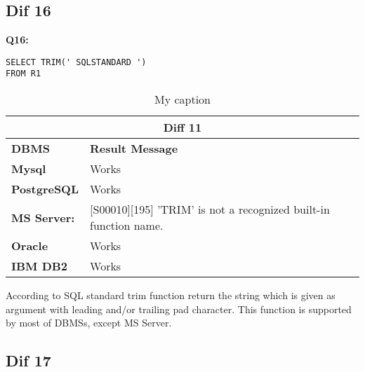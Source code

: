 \subsection{Dif 16}

\begin{mdframed}[backgroundcolor=lightgray!20] 
\textbf{Q16:}
\begin{lstlisting}
SELECT TRIM(' SQLSTANDARD ')
FROM R1
\end{lstlisting}
\end{mdframed} 

\begin{table}[h]
\centering
\caption{My caption}
\label{my-label}
\begin{tabular}{|p{2cm}|p{12cm}|}
\hline
\multicolumn{2}{|c|}{\textbf{Diff 11}}                                                                                                       \\ \hline
\textbf{DBMS}                              & \textbf{Result Message}                                                                         \\ \hline
{\color[HTML]{333333} \textbf{Mysql}}      & {\color[HTML]{333333} Works}                                                                    \\ \hline
{\color[HTML]{333333} \textbf{PostgreSQL}} & {\color[HTML]{333333} Works}                                                                    \\ \hline
{\color[HTML]{333333} \textbf{MS Server:}} & {\color[HTML]{333333} {[}S00010{]}{[}195{]} 'TRIM' is not a recognized built-in function name.} \\ \hline
\textbf{Oracle}                            & Works                                                                                           \\ \hline
\textbf{IBM DB2}                           & Works                                                                                           \\ \hline
\end{tabular}
\end{table}

According to SQL standard trim function return the string which is given as argument with leading and/or trailing pad character. This function is supported by most of DBMSs, except MS Server. 


\subsection{Dif 17}

